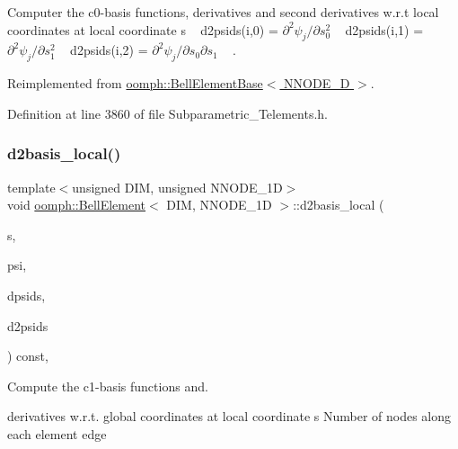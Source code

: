 Computer the c0-\/basis functions, derivatives and second derivatives w.\+r.\+t local coordinates at local coordinate s ~\newline
d2psids(i,0) = $ \partial^2 \psi_j / \partial s_0^2 $ ~\newline
d2psids(i,1) = $ \partial^2 \psi_j / \partial s_1^2 $ ~\newline
d2psids(i,2) = $ \partial^2 \psi_j / \partial s_0 \partial s_1 $ ~\newline
. 



Reimplemented from \hyperlink{classoomph_1_1BellElementBase_aa9db3995e26ddee02bdae16dae111c03}{oomph\+::\+Bell\+Element\+Base$<$ N\+N\+O\+D\+E\+\_\+D $>$}.



Definition at line 3860 of file Subparametric\+\_\+\+Telements.\+h.

\mbox{\label{classoomph_1_1BellElement_a58254e48913aa6428db33338b010a911}} 
\subsubsection{\texorpdfstring{d2basis\+\_\+local()}{d2basis\_local()}}
{\footnotesize\ttfamily template$<$unsigned D\+IM, unsigned N\+N\+O\+D\+E\+\_\+1D$>$ \\
void \hyperlink{classoomph_1_1BellElement}{oomph\+::\+Bell\+Element}$<$ D\+IM, N\+N\+O\+D\+E\+\_\+1D $>$\+::d2basis\+\_\+local (\begin{DoxyParamCaption}\item[{const \hyperlink{classoomph_1_1Vector}{Vector}$<$ double $>$ \&}]{s,  }\item[{\hyperlink{classoomph_1_1Shape}{Shape} \&}]{psi,  }\item[{\hyperlink{classoomph_1_1DShape}{D\+Shape} \&}]{dpsids,  }\item[{\hyperlink{classoomph_1_1DShape}{D\+Shape} \&}]{d2psids }\end{DoxyParamCaption}) const\hspace{0.3cm}{\ttfamily [inline]}, {\ttfamily [virtual]}}



Compute the c1-\/basis functions and. 

derivatives w.\+r.\+t. global coordinates at local coordinate s Number of nodes along each element edge 

